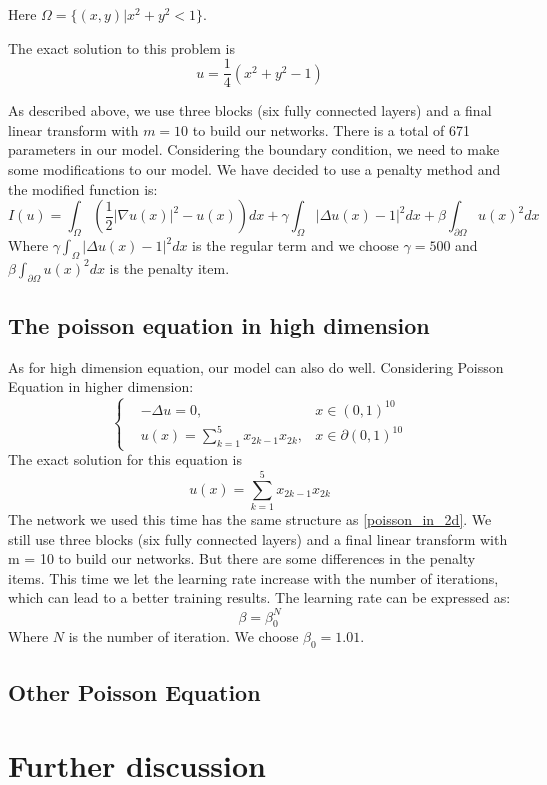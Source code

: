 \documentclass{article}
\begin{document}
Here $\Omega =\{(x,y)| x^2+y^2<1\}$.
\par The exact solution to this problem is 
\begin{equation}
u=\frac{1}{4}(x^2+y^2-1)
\end{equation}

\par As described above, we use three blocks (six fully connected layers) and a final linear transform with $m=10$ to build our networks. There is a total of 671 parameters in our model. Considering the boundary condition, we need to make some modifications to our model. We have decided to use a penalty method and the modified function is:
\begin{equation}
I(u)=\int_{\Omega}\left(\frac{1}{2}|\nabla u(x)|^2-u(x)\right)dx+\gamma\int_{\Omega}|\Delta u(x) - 1|^2dx+\beta\int_{\partial \Omega}u(x)^2dx
\end{equation}
Where $\gamma\int_{\Omega}|\Delta u(x) - 1|^2dx$ is the regular term and we choose $\gamma=500$ and $\beta\int_{\partial \Omega}u(x)^2dx$ is the penalty item.

\subsection{The poisson equation in high dimension}
As for high dimension equation, our model can also do well. Considering Poisson Equation in higher dimension:
\begin{equation}
\left \{
\begin{aligned}
&-\Delta u =0, &x\in (0,1)^{10} \\
&u(x)=\sum\limits_{k=1}^5x_{2k-1}x_{2k}, &x\in \partial (0,1)^{10}
\end{aligned}
\right.
\end{equation}
The exact solution for this equation is 
\begin{equation}
u(x)=\sum\limits_{k=1}^5x_{2k-1}x_{2k}
\end{equation}
The network we used this time has the same structure as \ref{poisson_in_2d}. We still use three blocks (six fully connected layers) and a final linear transform with m = 10 to build our networks. But there are some differences in the penalty items. This time we let the learning rate increase with the number of iterations, which can lead to a better training results. The learning rate can be expressed as:
\begin{equation}
\beta=\beta_{0}^N
\end{equation}
Where $N$ is the number of iteration. We choose $\beta_0=1.01$.

\subsection{Other Poisson Equation}


\section{Further discussion}




\medskip

\small
\end{document}
